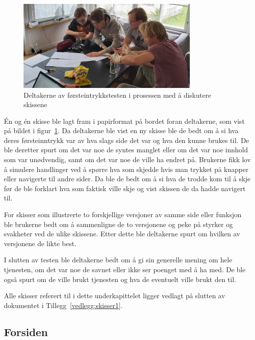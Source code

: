 
\begin{figure}[H]
\includegraphics[width=0.8\textwidth]{Illustrasjoner/skissetest-bilde.jpg}
\centering
\caption{Deltakerne av førsteintrykkstesten i prosessen med å diskutere skissene}
\label{fig:skissetest}
\end{figure}

Én og én skisse ble lagt fram i papirformat på bordet foran deltakerne, som vist på bildet i figur~\ref{fig:skissetest}. Da deltakerne ble vist en ny skisse ble de bedt om å si hva deres førsteinntrykk var av hva slags side det var og hva den kunne brukes til. De ble deretter spurt om det var noe de syntes manglet eller om det var noe innhold som var unødvendig, samt om det var noe de ville ha endret på. Brukerne fikk lov å simulere handlinger ved å spørre hva som skjedde hvis man trykket på knapper eller navigerte til andre sider. Da ble de bedt om å si hva de trodde kom til å skje før de ble forklart hva som faktisk ville skje og vist skissen de da hadde navigert til.

For skisser som illustrerte to forskjellige versjoner av samme side eller funksjon ble brukerne bedt om å sammenligne de to versjonene og peke på styrker og svakheter ved de ulike skissene. Etter dette ble deltakerne spurt om hvilken av versjonene de likte best.

I slutten av testen ble deltakerne bedt om å gi sin generelle mening om hele tjenesten, om det var noe de savnet eller ikke ser poenget med å ha med. De ble også spurt om de ville brukt tjenesten og hva de eventuelt ville brukt den til.

Alle skisser referert til i dette underkapittelet ligger vedlagt på slutten av dokumentet i Tillegg~\ref{vedlegg:skisser1}.

\subsection{Forsiden}

